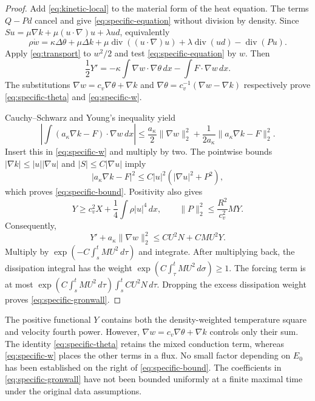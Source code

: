 \documentclass[10pt,twoside]{article}
\newcommand{\dd}{\,dx}
\newcommand{\Div}{\operatorname{div}}
\newcommand{\norm}[2]{\lVert#1\rVert_{#2}}
\begin{document}
\begin{proof}
Add \eqref{eq:kinetic-local} to the material form of the heat equation.
The terms $Q-Pd$ cancel and give \eqref{eq:specific-equation}
without division by density. Since
$Su=\mu\nabla k+\mu(u\cdot\nabla)u+\lambda ud$, equivalently
\[
 \rho\dot w=\kappa\Delta\theta+\mu\Delta k
       +\mu\Div((u\cdot\nabla)u)+\lambda\Div(ud)-\Div(Pu).
\]
Apply \eqref{eq:transport} to $w^2/2$ and test
\eqref{eq:specific-equation} by $w$. Then
\begin{equation}\label{eq:specific-test}
 \frac12Y'=-\kappa\int\nabla w\cdot\nabla\theta\dd
                     -\int F\cdot\nabla w\dd.
\end{equation}
The substitutions $\nabla w=c_v\nabla\theta+\nabla k$ and
$\nabla\theta=c_v^{-1}(\nabla w-\nabla k)$ respectively prove
\eqref{eq:specific-theta} and \eqref{eq:specific-w}.

Cauchy--Schwarz and Young's inequality yield
\[
 \left|\int(a_\kappa\nabla k-F)\cdot\nabla w\dd\right|
 \le\frac{a_\kappa}{2}\norm{\nabla w}{2}^2
       +\frac1{2a_\kappa}\norm{a_\kappa\nabla k-F}{2}^2.
\]
Insert this in \eqref{eq:specific-w} and multiply by two.
The pointwise bounds $|\nabla k|\le|u||\nabla u|$ and
$|S|\le C|\nabla u|$ imply
\[
 |a_\kappa\nabla k-F|^2\le C|u|^2(|\nabla u|^2+P^2),
\]
which proves \eqref{eq:specific-bound}. Positivity also gives
\begin{equation}\label{eq:specific-positive}
 Y\ge c_v^2X+\frac14\int\rho|u|^4\dd,\qquad
 \norm{P}{2}^2\le\frac{R^2}{c_v^2}MY.
\end{equation}
Consequently,
\begin{equation}\label{eq:specific-coefficients}
 Y'+a_\kappa\norm{\nabla w}{2}^2\le CU^2N+CMU^2Y.
\end{equation}
Multiply by $\exp(-C\int_s^tMU^2\,d\tau)$ and integrate.
After multiplying back, the dissipation integral has the weight
$\exp(C\int_\tau^tMU^2\,d\sigma)\ge1$.
The forcing term is at most
$\exp(C\int_s^tMU^2\,d\tau)\int_s^tCU^2N\,d\tau$.
Dropping the excess dissipation weight proves
\eqref{eq:specific-gronwall}.
\end{proof}

The positive functional $Y$ contains both the density-weighted
temperature square and velocity fourth power.
However, $\nabla w=c_v\nabla\theta+\nabla k$ controls only their sum.
The identity \eqref{eq:specific-theta} retains the mixed conduction
term, whereas \eqref{eq:specific-w} places the other terms in a flux.
No small factor depending on $E_0$ has been established on the right
of \eqref{eq:specific-bound}. The coefficients in
\eqref{eq:specific-gronwall} have not been bounded uniformly at a
finite maximal time under the original data assumptions.
\end{document}
